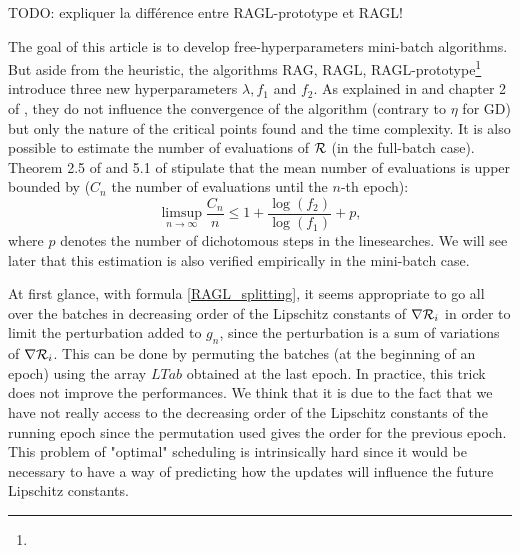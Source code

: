 TODO: expliquer la différence entre RAGL-prototype et RAGL!

\begin{remark}
  The goal of this article is to develop free-hyperparameters mini-batch algorithms. But aside from the heuristic, the algorithms RAG, RAGL, RAGL-prototype\footnote{} introduce three new hyperparameters $\lambda, f_1$ and $f_2$. As explained in \cite{Lyap_Theory_Bilel,Bilel_ICML} and chapter 2 of \cite{Bilel_thesis}, they do not influence the convergence of the algorithm (contrary to $\eta$ for GD) but only the nature of the critical points found and the time complexity. It is also possible to estimate the number of evaluations of $\mathcal{R}$ (in the full-batch case). Theorem 2.5 of \cite{Bilel_thesis} and 5.1 of \cite{Bilel_ICML} stipulate that the mean number of evaluations is upper bounded by ($C_n$ the number of evaluations until the $n$-th epoch):
\begin{equation}
	\displaystyle{\limsup_{n\to \infty}}\dfrac{C_n}{n} \leq 1+\frac{\log(f_2)}{\log(f_1)}+p,
	\label{complexity_law}
\end{equation}
where $p$ denotes the number of dichotomous steps in the linesearches. 
We will see later that this estimation is also verified empirically in the mini-batch case.
\end{remark}

\begin{remark}
	At first glance, with formula \eqref{RAGL_splitting}, it seems appropriate to go all over the batches in decreasing order of the Lipschitz constants of $\nabla \mathcal{R}_i$ in order to limit the perturbation added to $g_n$, since the perturbation is a sum of variations of $\nabla \mathcal{R}_i$. This can be done by permuting the batches (at the beginning of an epoch) using the array $LTab$ obtained at the last epoch. In practice, this trick does not improve the performances. We think that it is due to the fact that we have not really access to the decreasing order of the Lipschitz constants of the running epoch since the permutation used gives the order for the previous epoch. This problem of "optimal" scheduling is intrinsically hard since it would be necessary to have a way of predicting how the updates will influence the future Lipschitz constants.   
\end{remark}

